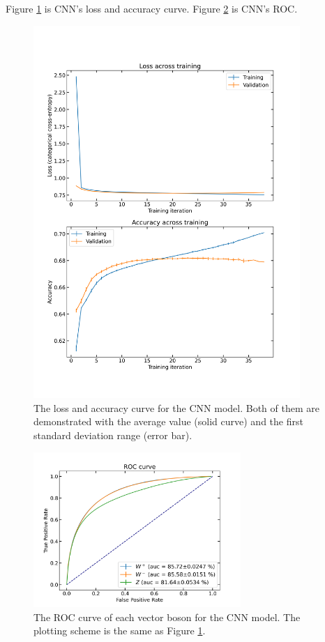 \documentclass[12pt]{article}
\begin{document}
		Figure \ref{fig:CNN learning curve_correct_decay_width} is CNN's loss and accuracy curve. Figure \ref{fig:CNN roc curve_correct_decay_width} is CNN's ROC.
		\begin{figure}[htpb]
			\centering
			\includegraphics[width=0.90\textwidth]{CNN_loss_and_accuracy_correct_width.png}
			\caption{The loss and accuracy curve for the CNN model. Both of them are demonstrated with the average value (solid curve) and the first standard deviation range (error bar).}
			\label{fig:CNN learning curve_correct_decay_width}
		\end{figure}
		\begin{figure}[htpb]
			\centering
			\includegraphics[width=0.70\textwidth]{CNN_roc_auc_correct_width.png}
			\caption{The ROC curve of each vector boson for the CNN model. The plotting scheme is the same as Figure \ref{fig:CNN learning curve_correct_decay_width}.}
			\label{fig:CNN roc curve_correct_decay_width}
		\end{figure}
		
\end{document}
